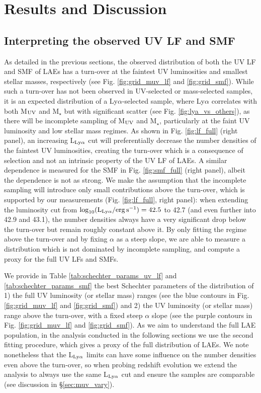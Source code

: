 \documentclass[a4paper,fleqn,usenatbib]{mnras}
\begin{document}
\section{Results and Discussion} \label{sec:results}

\subsection{Interpreting the observed UV LF and SMF} \label{sec:interpret_LF}
As detailed in the previous sections, the observed distribution of both the UV LF and SMF of LAEs has a turn-over at the faintest UV luminosities and smallest stellar masses, respectively (see Fig. \ref{fig:grid_muv_lf} and \ref{fig:grid_smf}). While such a turn-over has not been observed in UV-selected or mass-selected samples, it is an expected distribution of a Ly$\alpha$-selected sample, where Ly$\alpha$ correlates with both M$_{\rm UV}$ and M$_\star$ but with significant scatter (see Fig. \ref{fig:lya_vs_others}), as there will be incomplete sampling of M$_{\rm UV}$ and M$_\star$, particularly at the faint UV luminosity and low stellar mass regimes.  As shown in Fig. \ref{fig:lf_full} (right panel), an increasing L$_{\rm Ly\alpha}$ cut will preferentially decrease the number densities of the faintest UV luminosities, creating the turn-over which is a consequence of selection and not an intrinsic property of the UV LF of LAEs. A similar dependence is measured for the SMF in Fig. \ref{fig:smf_full} (right panel), albeit the dependence is not as strong. We make the assumption that the incomplete sampling will introduce only small contributions above the turn-over, which is supported by our measurements (Fig. \ref{fig:lf_full}, right panel): when extending the luminosity cut from $\log_{10} (\rm L_{Ly\alpha}/erg\,s^{-1})=42.5$ to 42.7 (and even further into 42.9 and 43.1), the number densities always have a very significant drop below the turn-over but remain roughly constant above it. By only fitting the regime above the turn-over and by fixing $\alpha$ as a steep slope, we are able to measure a distribution which is not dominated by incomplete sampling, and compute a proxy for the full UV LFs and SMFs.

We provide in Table \ref{tab:schechter_params_uv_lf} and \ref{tab:schechter_params_smf} the best Schechter parameters of the distribution of 1) the full UV luminosity (or stellar mass) ranges (see the blue contours in Fig. \ref{fig:grid_muv_lf} and \ref{fig:grid_smf}) and 2) the UV luminosity (or stellar mass) range above the turn-over, with a fixed steep $\alpha$ slope (see the purple contours in Fig. \ref{fig:grid_muv_lf} and \ref{fig:grid_smf}). As we aim to understand the full LAE population, in the analysis conducted in the following sections we use the second fitting procedure, which gives a proxy of the full distribution of LAEs. We note nonetheless that the L$_{\rm Ly\alpha}$ limits can have some influence on the number densities even above the turn-over, so when probing redshift evolution we extend the analysis to always use the same L$_{\rm Ly\alpha}$ cut and ensure the samples are comparable (see discussion in \S\ref{sec:muv_vary}).
\end{document}

